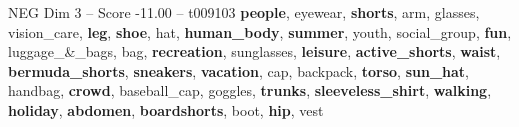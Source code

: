 \begin{textsample}{NEG Dim 3 – Score -11.00 – t009103}  \label{ex:f3_neg_039}
\textbf{people}, eyewear, \textbf{shorts}, arm, glasses, vision\_care, \textbf{leg}, \textbf{shoe}, hat, \textbf{human\_body}, \textbf{summer}, youth, social\_group, \textbf{fun}, luggage\_\&\_bags, bag, \textbf{recreation}, sunglasses, \textbf{leisure}, \textbf{active\_shorts}, \textbf{waist}, \textbf{bermuda\_shorts}, \textbf{sneakers}, \textbf{vacation}, cap, backpack, \textbf{torso}, \textbf{sun\_hat}, handbag, \textbf{crowd}, baseball\_cap, goggles, \textbf{trunks}, \textbf{sleeveless\_shirt}, \textbf{walking}, \textbf{holiday}, \textbf{abdomen}, \textbf{boardshorts}, boot, \textbf{hip}, vest

\end{textsample}
